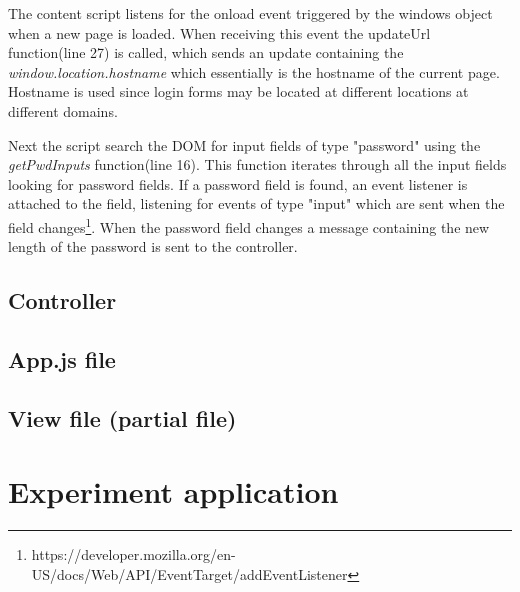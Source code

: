 The content script listens for the onload event triggered by the windows object when a new page is loaded. When receiving this event the updateUrl function(line 27) is called, which sends an update containing the \emph{window.location.hostname} which essentially is the hostname of the current page. Hostname is used since login forms may be located at different locations at different domains.
\par Next the script search the DOM for input fields of type "password" using the \emph{getPwdInputs} function(line 16). This function iterates through all the input fields looking for password fields. If a password field is found, an event listener is attached to the field, listening for events of type "input" which are sent when the field changes\footnote{https://developer.mozilla.org/en-US/docs/Web/API/EventTarget/addEventListener}. When the password field changes a message containing the new length of the password is sent to the controller. 

\section{Controller}\label{app:controller}


\section{App.js file}\label{app:app.js}


\section{View file (partial file)}\label{app:view}




\chapter{Experiment application}\label{experiment-views}
